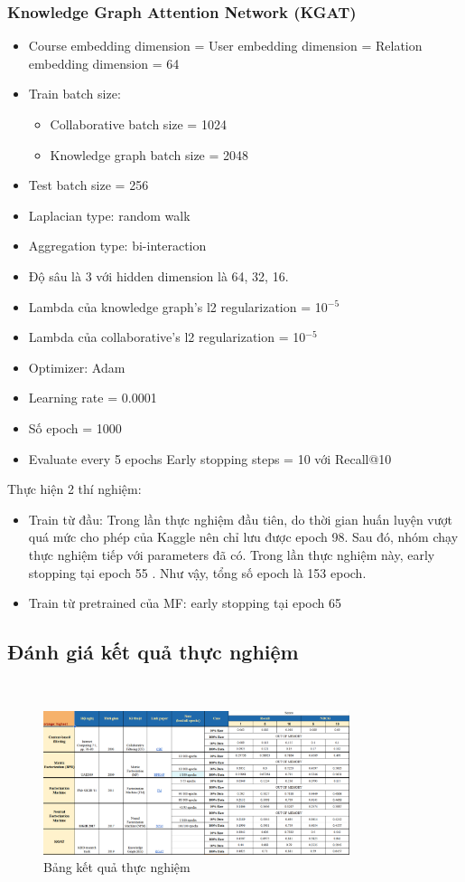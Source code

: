 \subsubsection{Knowledge Graph Attention Network (KGAT)}
\begin{itemize}
    \item Course embedding dimension = User embedding dimension = Relation embedding dimension = 64
    \item Train batch size:
    \begin{itemize}
        \item Collaborative batch size = 1024
        \item Knowledge graph batch size = 2048
    \end{itemize}
    \item Test batch size = 256
    \item Laplacian type: random walk
    \item Aggregation type: bi-interaction
    \item Độ sâu là 3 với hidden dimension là 64, 32, 16.
    \item Lambda của knowledge graph’s l2 regularization = 10$^{-5}$
    \item Lambda của collaborative’s l2 regularization = 10$^{-5}$
    \item Optimizer: Adam
    \item Learning rate = 0.0001
    \item Số epoch = 1000
    \item Evaluate every 5 epochs Early stopping steps = 10 với Recall@10
\end{itemize}
Thực hiện 2 thí nghiệm: 
\begin{itemize}
    \item Train từ đầu: Trong lần thực nghiệm đầu tiên, do thời gian huấn luyện vượt quá mức cho phép của Kaggle nên chỉ lưu được epoch 98. Sau đó, nhóm chạy thực nghiệm tiếp với parameters đã có. Trong lần thực nghiệm này, early stopping tại epoch 55 . Như vậy, tổng số epoch là 153 epoch.
    \item Train từ pretrained của MF: early stopping tại epoch 65
\end{itemize}
\subsection{Đánh giá kết quả thực nghiệm}
\textbf{}\\
\label{sec:ketqua}
\begin{figure}[h]
    \centering
    \includegraphics[width=0.8\textwidth]{figures/71.png}
    \caption{Bảng kết quả thực nghiệm}
\end{figure}
